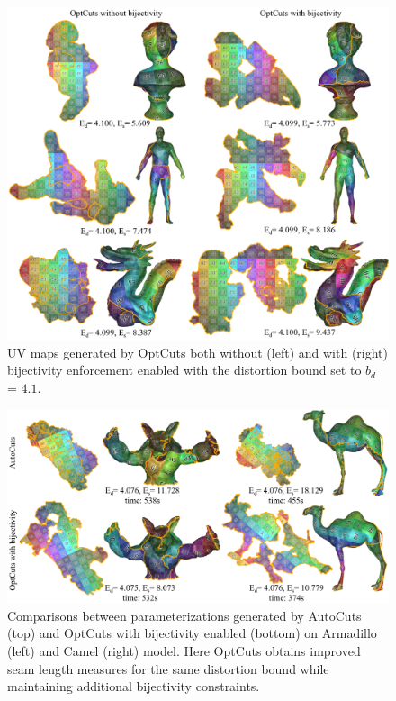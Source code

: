%
\begin{figure}[t]
\centering
\includegraphics[width=\linewidth]{fig/our_impressive_results_right.png}
\vspace{-0.5cm}
\caption{UV maps generated by OptCuts both without (left) and with (right) bijectivity enforcement enabled with the distortion bound set to $b_d$ = $4.1$.}
\vspace{-0.3cm}
\label{fig:our_impressive_results}
\end{figure}


\begin{figure}[tb]
\centering
\includegraphics[width=\linewidth]{fig/comp_AutoCuts.png}
\vspace{-0.5cm}
\caption{Comparisons between parameterizations generated by AutoCuts (top) and OptCuts with bijectivity enabled (bottom) on Armadillo (left) and Camel (right) model. Here OptCuts obtains improved  seam length measures for the same distortion bound while maintaining additional bijectivity constraints.}
\vspace{-0.3cm}
\label{fig:comp_AutoCuts}
\end{figure}



